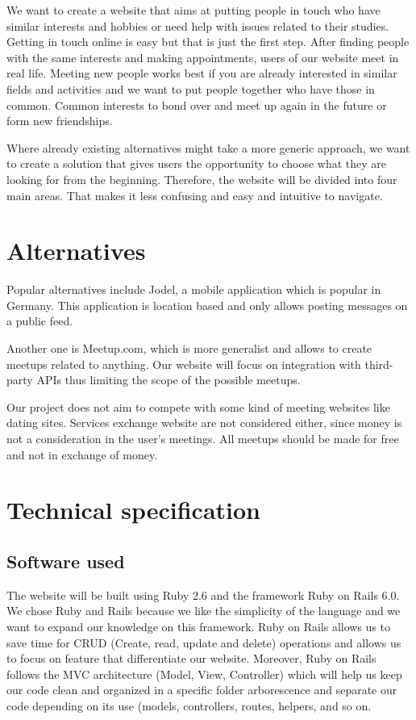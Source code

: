 \documentclass[conference]{IEEEtran}
\begin{document}
We want to create a website that aims at putting people in touch who have similar interests and hobbies or need help with issues related to their studies. Getting in touch online is easy but that is just the first step. After finding people with the same interests and making appointments, users of our website meet in real life. Meeting new people works best if you are already interested in similar fields and activities and we want to put people together who have those in common. Common interests to bond over and meet up again in the future or form new friendships.

Where already existing alternatives might take a more generic approach, we want to create a solution that gives users the opportunity to choose what they are looking for from the beginning. Therefore, the website will be divided into four main areas. That makes it less confusing and easy and intuitive to navigate.

\section{Alternatives}

Popular alternatives include Jodel, a mobile application which is popular in Germany. This application is location based and only allows posting messages on a public feed.

Another one is Meetup.com, which is more generalist and allows to create meetups related to anything. Our website will focus on integration with third-party APIs thus limiting the scope of the possible meetups.

Our project does not aim to compete with some kind of meeting websites like dating sites. Services exchange website are not considered either, since money is not a consideration in the user’s meetings. All meetups should be made for free and not in exchange of money.

\section{Technical specification}

\subsection{Software used}

The website will be built using Ruby 2.6 and the framework Ruby on Rails 6.0. We chose Ruby and Rails because we like the simplicity of the language and we want to expand our knowledge on this framework. Ruby on Rails allows us to save time for CRUD (Create, read, update and delete) operations and allows us to focus on feature that differentiate our website. Moreover, Ruby on Rails follows the MVC architecture (Model, View, Controller) which will help us keep our code clean and organized in a specific folder arborescence and separate our code depending on its use (models, controllers, routes, helpers, and so on.
\end{document}
